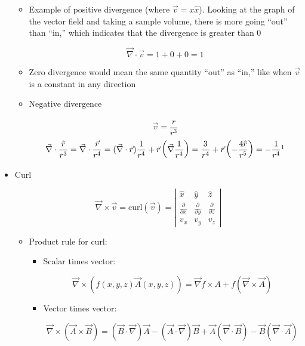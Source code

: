 \begin{itemize}
    \begin{itemize}

      \item Example of positive divergence (where $\vec{v}=x\hat{x}$). Looking at the graph of the vector field and taking a sample volume, there is more going ``out'' than ``in,'' which indicates that the divergence is greater than 0

        $$\vec{\nabla}\cdot\vec{v}=1 + 0 + 0=1$$

      \item Zero divergence would mean the same quantity ``out'' as ``in,'' like when $\vec{v}$ is a constant in any direction

      \item Negative divergence 

        $$\vec{v}=\frac{\hat{r}}{r^3}$$
        $$\vec{\nabla}\cdot\frac{\hat{r}}{r^3}=\vec{\nabla}\cdot\frac{\vec{r}}{r^4}=(\vec{\nabla}\cdot\vec{r})\frac{1}{r^4}+\vec{r}\left( \vec{\nabla}\frac{1}{r^4} \right)=\frac{3}{r^4}+\vec{r}\left( -\frac{4\hat{r}}{r^5} \right)=-\frac{1}{r^4}\footnote{Keep in mind, $r\hat{r}=\vec{r}$, and $\vec{r}=x\hat{x}+y\hat{y}+z\hat{z}$}$$

    \end{itemize}
    
  \item Curl

    $$\vec{\nabla}\times\vec{v}=\text{curl}(\vec{v})=\left|\begin{matrix} \hat{x} & \hat{y} & \hat{z}\\ \frac{\partial}{\partial x} & \frac{\partial}{\partial y} & \frac{\partial}{\partial z} \\ v_x & v_y & v_z\end{matrix}\right|$$

    \begin{itemize}

      \item Product rule for curl:

        \begin{itemize}

          \item Scalar times vector:

            $$\vec{\nabla}\times(f(x,y,z)\vec{A}(x,y,z))=\vec{\nabla}f\times A+f(\vec{\nabla}\times\vec{A})$$

          \item Vector times vector:

            $$\vec{\nabla}\times(\vec{A}\times\vec{B})=(\vec{B}\cdot\vec{\nabla})\vec{A}-(\vec{A}\cdot\vec{\nabla})\vec{B}+\vec{A}(\vec{\nabla}\cdot\vec{B})-\vec{B}(\vec{\nabla}\cdot\vec{A})$$

        \end{itemize}

    \end{itemize}

\end{itemize}



